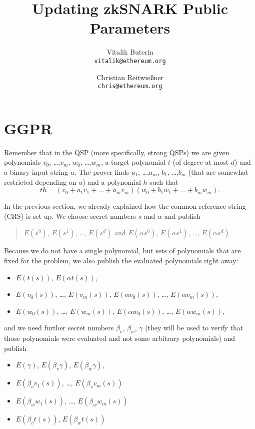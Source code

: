 \documentclass[11pt,letterpaper]{article}
\date{}
\begin{document}


\title{Updating zkSNARK Public Parameters}

\author{Vitalik Buterin\\
{\tt vitalik@ethereum.org}
\and
Christian Reitwießner\\
{\tt chris@ethereum.org}}


\maketitle


\begin{abstract}
\noindent 
\end{abstract}



\section{GGPR}

Remember that in the QSP (more specifically, strong QSPs) we are given polynomials $v_{0}$, \dots,$v_{m}$, $w_{0}$, \dots,$w_{m}$, a target polynomial $t$ (of degree at most $d$) and a binary input string $u$. The prover finds $a_{1}$, \dots,$a_{m}$, $b_{1}$, \dots,$b_{m}$ (that are somewhat restricted depending on $u$) and a polynomial $h$ such that
\[
t h = (v_{0} + a_{1}v_{1} +  \dots  + a_{m}v_{m}) (w_{0} + b_{1}w_{1} +  \dots  + b_{m}w_{m}).
\]


In the previous section, we already explained how the common reference string (CRS) is set up. We choose secret numbers $s$ and $\alpha$  and publish
\begin{quote}
$E(s^{0})$, $E(s^{1})$,  \dots, $E(s^{d})$ \quad and \quad $E(\alpha s^{0})$, $E(\alpha s^{1})$,  \dots, $E(\alpha s^{d})$
\end{quote}

Because we do not have a single polynomial, but sets of polynomials that are fixed for the problem, we also publish the evaluated polynomials right away:
\begin{itemize}
\item $E(t(s))$, $E(\alpha  t(s))$,
\item $E(v_{0}(s))$,  \dots, $E(v_{m}(s))$, $E(\alpha  v_{0}(s))$,  \dots, $E(\alpha  v_{m}(s))$,
\item $E(w_{0}(s))$,  \dots, $E(w_{m}(s))$, $E(\alpha  w_{0}(s))$,  \dots, $E(\alpha  w_{m}(s))$,
\end{itemize}


and we need further secret numbers $\beta _{v}$, $\beta _{w}$, $\gamma$  (they will be used to verify that those polynomials were evaluated and not some arbitrary polynomials) and publish
\begin{itemize}
\item $E(\gamma )$, $E(\beta _{v} \gamma )$, $E(\beta _{w} \gamma )$,
\item $E(\beta _{v} v_{1}(s))$,  \dots, $E(\beta _{v} v_{m}(s))$
\item $E(\beta _{w} w_{1}(s))$,  \dots, $E(\beta _{w} w_{m}(s))$
\item $E(\beta _{v} t(s))$, $E(\beta _{w} t(s))$
\end{itemize}
\end{document}
